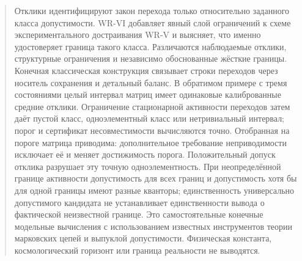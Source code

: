 \maketitle
\begin{abstract}
{Отклики идентифицируют закон перехода только относительно заданного класса допустимости. WR-VI добавляет явный слой ограничений к схеме экспериментального достраивания WR-V и выясняет, что именно удостоверяет граница такого класса. Различаются наблюдаемые отклики, структурные ограничения и независимо обоснованные жёсткие границы. Конечная классическая конструкция связывает строки переходов через носитель сохранения и детальный баланс. В обратимом примере с тремя состояниями целый интервал матриц имеет одинаковые калиброванные средние отклики. Ограничение стационарной активности переходов затем даёт пустой класс, одноэлементный класс или нетривиальный интервал; порог и сертификат несовместимости вычисляются точно. Отобранная на пороге матрица приводима: дополнительное требование неприводимости исключает её и меняет достижимость порога. Положительный допуск отклика разрушает эту точную одноэлементность. При неопределённой границе активности допустимость для всех границ и допустимость хотя бы для одной границы имеют разные кванторы; единственность универсально допустимого кандидата не устанавливает единственности вывода о фактической неизвестной границе. Это самостоятельные конечные модельные вычисления с использованием известных инструментов теории марковских цепей и выпуклой допустимости. Физическая константа, космологический горизонт или граница реальности не выводятся.}
\end{abstract}
